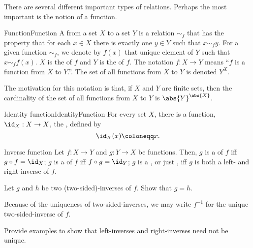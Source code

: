There are several different important types of relations.  Perhaps the most important is the notion of a function.
\begin{dfn}{Function}{Function}
A  from a set $X$ to a set $Y$ is a relation $\sim _f$ that has the property that for each $x\in X$ there is exactly one $y\in Y$ such that $x\sim _fy$.  For a given function $\sim _f$, we denote by $f(x)$ that unique element of $Y$ such that $x\sim _ff(x)$.  $X$ is the  of $f$ and $Y$ is the  of $f$.  The notation $f\colon X\rightarrow Y$ means ``$f$ is a function from $X$ to $Y$.''.  The set of all functions from $X$ to $Y$ is denoted $Y^X$.
\begin{rmk}
The motivation for this notation is that, if $X$ and $Y$ are finite sets, then the cardinality of the set of all functions from $X$ to $Y$ is $\abs{Y}^{\abs{X}}$.
\end{rmk}
\end{dfn}
\begin{exm}{Identity function}{IdentityFunction}
For every set $X$, there is a function, $\id _X:X\rightarrow X$, the , defined by
\begin{equation}
\id _X(x)\coloneqq x.
\end{equation}
\end{exm}
\begin{dfn}{Inverse function}{}
Let $f\colon X\rightarrow Y$ and $g\colon Y\rightarrow X$ be functions.  Then, $g$ is a  of $f$ iff $g\circ f=\id _X$; $g$ is a  of $f$ iff $f\circ g=\id _Y$; $g$ is a , or just , iff $g$ is both a left- and right-inverse of $f$.
\begin{exr}{}{}
Let $g$ and $h$ be two (two-sided)-inverses of $f$.  Show that $g=h$.
\end{exr}
Because of the uniqueness of two-sided-inverses, we may write $f^{-1}$ for the unique two-sided-inverse of $f$.
\end{dfn}
\begin{exr}{}{}
Provide examples to show that left-inverses and right-inverses need not be unique.
\end{exr}
